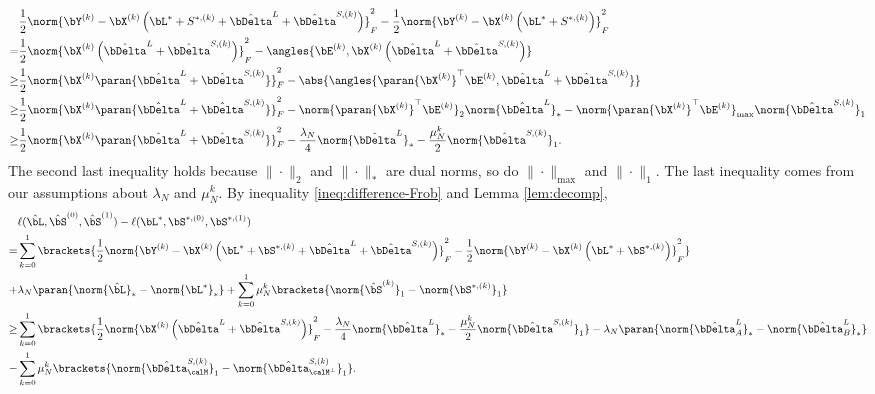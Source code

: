        \begin{equation}
       	\begin{aligned}
       		 &\frac{1}{2}\norm{\bY^{(k)}-\bX^{(k)}\left(\bL^*+S^{*,(k)}+\hat\bDelta^L+\hat\bDelta^{S, (k)}\right)}_F^2-      \frac{1}{2}\norm{\bY^{(k)}-\bX^{(k)}\left(\bL^*+S^{*,(k)}\right)}_F^2\\
       		=&\frac{1}{2}\norm{\bX^{(k)}\left(\hat\bDelta^L+\hat\bDelta^{S, (k)}\right)}_F^2-\angles{\bE^{(k)},\bX^{(k)}\left(\hat\bDelta^L+\hat\bDelta^{S, (k)}\right)}\\
       		\geq&\frac{1}{2}\norm{\bX^{(k)}\paran{\hat\bDelta^L+\hat\bDelta^{S, (k)}}}_F^2-\abs{\angles{\paran{\bX^{(k)}}^\top \bE^{(k)},\hat\bDelta^L+\hat\bDelta^{S, (k)}}}\\
       		\geq & \frac{1}{2}\norm{\bX^{(k)}\paran{\hat\bDelta^L+\hat\bDelta^{S, (k)}}}_F^2 - \norm{\paran{\bX^{(k)}}^\top \bE^{(k)}}_2\norm{\hat\bDelta^L}_* - \norm{\paran{\bX^{(k)}}^\top \bE^{(k)}}_{\max}\norm{\hat\bDelta^{S, (k)}}_1\\
       		\geq &\frac{1}{2}\norm{\bX^{(k)}\paran{\hat\bDelta^L+\hat\bDelta^{S, (k)}}}_F^2 - \frac{\lambda_N}{4}\norm{\hat\bDelta^L}_* - \frac{\mu^k_N}{2}\norm{\hat\bDelta^{S, (k)}}_1.
       	\end{aligned}
       \label{ineq:difference-Frob}
       \end{equation}
       The second last inequality holds because $\|\cdot\|_{2}$ and $\|\cdot\|_{*}$ are dual norms, so do $\|\cdot\|_{\max}$ and $\|\cdot\|_{1}$. The last inequality comes from our assumptions about $\lambda_N$ and $\mu^k_N$. By inequality \eqref{ineq:difference-Frob} and Lemma \ref{lem:decomp}, 
        \begin{equation}
       	\begin{aligned}
       		 &\ell(\hat\bL, \hat\bS^{(0)}, \hat\bS^{(1)}) - \ell(\bL^*, \bS^{*,(0)}, \bS^{*,(1)})\\
       		=&\sum_{k=0}^1\brackets{\frac{1}{2} \norm{\bY^{(k)}-\bX^{(k)}\left(\bL^*+\bS^{*,(k)}+\hat\bDelta^L+\hat\bDelta^{S, (k)}\right)}_F^2-      \frac{1}{2}\norm{\bY^{(k)}-\bX^{(k)}\left(\bL^*+\bS^{*,(k)}\right)}_F^2}\\
       		+&\lambda_N\paran{\norm{\hat\bL}_*-\norm{\bL^*}_*} + \sum_{k=0}^1 \mu^k_{N}\brackets{\norm{\hat\bS^{(k)}}_1-\norm{\bS^{*, (k)}}_1}\\
       		\geq&\sum_{k=0}^1\brackets{\frac{1}{2}\norm{\bX^{(k)}\left(\hat\bDelta^L+\hat\bDelta^{S, (k)}\right)}_F^2-\frac{\lambda_N}{4}\norm{\hat\bDelta^L}_* - \frac{\mu^k_N}{2}\norm{\hat\bDelta^{S, (k)}}_1} - \lambda_N\paran{\norm{\hat\bDelta^{L}_A}_* - \norm{\hat\bDelta^{L}_B}_*} \\
       		- & \sum_{k=0}^1 \mu^k_{N}\brackets{\norm{\hat\bDelta^{S, (k)}_{\calM}}_1 - \norm{\hat\bDelta^{S, (k)}_{\calM^{\perp}}}_1}.
       	\end{aligned}
        \label{ineq:difference-l}
       \end{equation}
